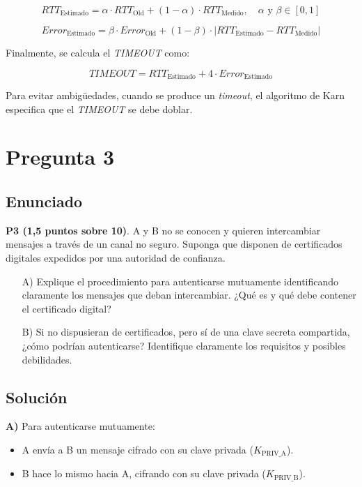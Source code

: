 \documentclass[12pt]{article}
\begin{document}
\[
RTT_{\text{Estimado}} = \alpha \cdot RTT_{\text{Old}} + (1 - \alpha) \cdot RTT_{\text{Medido}}, \quad \alpha \text{ y } \beta \in [0, 1]
\]

\[
Error_{\text{Estimado}} = \beta \cdot Error_{\text{Old}} + (1 - \beta) \cdot \lvert RTT_{\text{Estimado}} - RTT_{\text{Medido}} \rvert
\]

Finalmente, se calcula el \textit{TIMEOUT} como:

\[
TIMEOUT = RTT_{\text{Estimado}} + 4 \cdot Error_{\text{Estimado}}
\]

Para evitar ambigüedades, cuando se produce un \textit{timeout}, el algoritmo de Karn especifica que el \textit{TIMEOUT} se debe doblar.


\section{Pregunta 3}

\subsection{Enunciado}

\textbf{P3 (1,5 puntos sobre 10)}. A y B no se conocen y quieren intercambiar mensajes a través de un canal no seguro. Suponga que disponen de certificados digitales expedidos por una autoridad de confianza.

\begin{itemize}
    \item[A)] Explique el procedimiento para autenticarse mutuamente identificando claramente los mensajes que deban intercambiar. ¿Qué es y qué debe contener el certificado digital?
    \item[B)] Si no dispusieran de certificados, pero sí de una clave secreta compartida, ¿cómo podrían autenticarse? Identifique claramente los requisitos y posibles debilidades.
\end{itemize}

\subsection{Solución}

\textbf{A)} Para autenticarse mutuamente:
\begin{itemize}
    \item A envía a B un mensaje cifrado con su clave privada (\(K_{\text{PRIV\_A}}\)).
    \item B hace lo mismo hacia A, cifrando con su clave privada (\(K_{\text{PRIV\_B}}\)).
\end{itemize}
\end{document}
